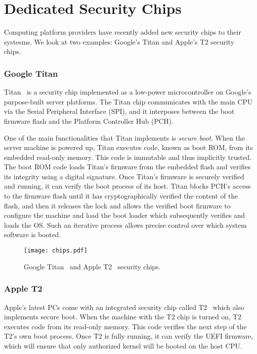 \section*{Dedicated Security Chips}

Computing platform providers have recently added new security chips to their systesms. We look at two examples: Google's Titan and Apple's T2 security chips.

\subsubsection*{Google Titan}

Titan~\cite{titan} is a security chip implemented as a low-power microcontroller on Google's purpose-built server platforms. The Titan chip communicates with the main CPU via the Serial Peripheral Interface (SPI), and it interposes between the boot firmware flash and the Platform Controller Hub (PCH).

 One of the main functionalities that Titan implements is \emph{secure boot}. When the server machine is powered up, Titan executes code, known as boot ROM, from its embedded read-only memory. This code is immutable and thus implicitly trusted. The boot ROM code loads Titan's firmware from the embedded flash and verifies its integrity using a digital signature. Once Titan's firmware is securely verified and running, it can verify the boot process of its host. Titan blocks PCH's access to the firmware flash until it has cryptographically verified the content of the flash, and then it releases the lock and allows the verified boot firmware to configure the machine and load the boot loader which subsequently verifies and loads the OS. Such an iterative process allows precise control over which system software is booted. 

\begin{figure}[t]
    \centering
    \texttt{[image: chips.pdf]}
    \caption{Google Titan~\cite{titan} and Apple T2~\cite{t2} security chips.}
\label{fig:prototype}   
\end{figure}

 
\subsubsection*{Apple T2}
 
Apple's latest PCs come with an integrated security chip called T2~\cite{t2} which also implements secure boot. When the machine with the T2 chip is turned on, T2 executes code from its read-only memory. This code verifies the next step of the T2's own boot process. Once T2 is fully running, it can verify the UEFI firmware, which will ensure that only authorized kernel will be booted on the host CPU.

